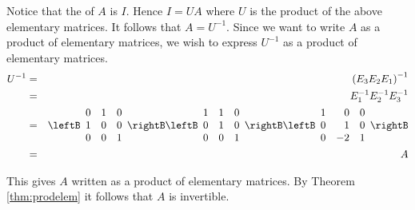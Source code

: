 \begin{solution}
Notice that the \rref \;of $A$ is $I$. Hence $I = UA$ where $U$ is the product of the above elementary matrices. It follows that $A = U^{-1}$. Since we want to write $A$ as a product of elementary matrices, we wish to express $U^{-1}$ as a product of elementary matrices. 
\begin{eqnarray*}
U^{-1} &=& \left( E_3 E_2 E_1 \right)^{-1}\\
&=& E_1^{-1} E_2^{-1} E_3^{-1} \\
&=& \leftB
\begin{array}{rrr}
0 & 1 & 0 \\
1 & 0 & 0 \\
0 & 0 & 1 
\end{array} \rightB
\leftB
\begin{array}{rrr}
1 & 1 & 0 \\
0 & 1 & 0 \\
0 & 0 & 1 
\end{array} \rightB
\leftB \begin{array}{rrr}
1 & 0 & 0 \\
0 & 1 & 0 \\
0 & -2 & 1 
\end{array} \rightB \\
&=& A
\end{eqnarray*}

This gives $A$ written as a product of elementary matrices. By Theorem \ref{thm:prodelem} it follows that $A$ is invertible. 
\end{solution}